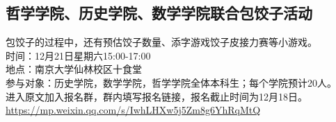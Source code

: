 \documentclass[letterpaper, 12pt]{article}
\begin{document}
\begin{multicols}{2}
\section{哲学学院、历史学院、数学学院联合包饺子活动}
包饺子的过程中，还有预估饺子数量、添字游戏饺子皮接力赛等小游戏。\\
时间：12月21日星期六15:00-17:00\\
地点：南京大学仙林校区十食堂\\
参与对象：历史学院，数学学院，哲学学院全体本科生；每个学院预计20人。\\
进入原文加入报名群，群内填写报名链接，报名截止时间为12月18日。\\
\url{https://mp.weixin.qq.com/s/IwhLHXw5j5Zm8g6YhRqMtQ}\\

\end{multicols} 
\end{document}
